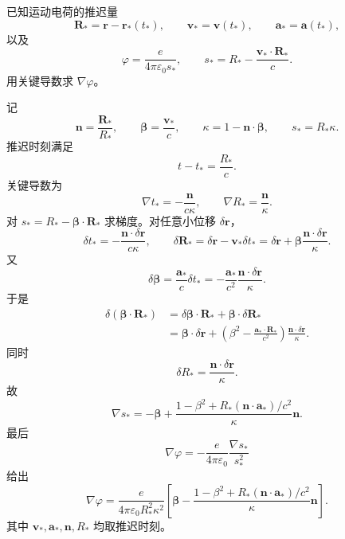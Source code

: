 \begin{question}
已知运动电荷的推迟量
\[
  \mathbf R_* = \mathbf r-\mathbf r_*(t_*),
  \qquad
  \mathbf v_* = \mathbf v(t_*),
  \qquad
  \mathbf a_* = \mathbf a(t_*),
\]
以及
\[
  \varphi=\frac{e}{4\pi\varepsilon_0s_*},
  \qquad
  s_*=R_* - \frac{\mathbf v_*\cdot\mathbf R_*}{c} .
\]
用关键导数求 $\nabla\varphi$。
\begin{solution}
记
\[
  \mathbf n=\frac{\mathbf R_*}{R_*},
  \qquad
  \boldsymbol\beta=\frac{\mathbf v_*}{c},
  \qquad
  \kappa=1-\mathbf n\cdot\boldsymbol\beta,
  \qquad
  s_*=R_*\kappa .
\]
推迟时刻满足
\[
  t-t_*=\frac{R_*}{c} .
\]
关键导数为
\[
  \nabla t_*=-\frac{\mathbf n}{c\kappa},
  \qquad
  \nabla R_* =\frac{\mathbf n}{\kappa} .
\]
对 $s_*=R_* - \boldsymbol\beta\cdot\mathbf R_*$ 求梯度。对任意小位移 $\delta\mathbf r$，
\[
  \delta t_*=-\frac{\mathbf n\cdot\delta\mathbf r}{c\kappa},
  \qquad
  \delta\mathbf R_*=
  \delta\mathbf r-\mathbf v_*\delta t_*
  =\delta\mathbf r+\boldsymbol\beta\frac{\mathbf n\cdot\delta\mathbf r}{\kappa} .
\]
又
\[
  \delta\boldsymbol\beta=\frac{\mathbf a_*}{c}\delta t_*
  =-\frac{\mathbf a_*}{c^2}\frac{\mathbf n\cdot\delta\mathbf r}{\kappa} .
\]
于是
\[
\begin{aligned}
  \delta(\boldsymbol\beta\cdot\mathbf R_*)
  &=\delta\boldsymbol\beta\cdot\mathbf R_*+\boldsymbol\beta\cdot\delta\mathbf R_* \\
  &=\boldsymbol\beta\cdot\delta\mathbf r
  +\left(\beta^2-\frac{\mathbf a_*\cdot\mathbf R_*}{c^2}\right)
    \frac{\mathbf n\cdot\delta\mathbf r}{\kappa} .
\end{aligned}
\]
同时
\[
  \delta R_* = \frac{\mathbf n\cdot\delta\mathbf r}{\kappa} .
\]
故
\[
  \nabla s_*=-\boldsymbol\beta+\frac{1-\beta^2+R_*(\mathbf n\cdot\mathbf a_*)/c^2}{\kappa}\mathbf n .
\]
最后
\[
  \nabla\varphi=-\frac{e}{4\pi\varepsilon_0}\frac{\nabla s_*}{s_*^2}
\]
给出
\[
  \boxed{
  \nabla\varphi
  =\frac{e}{4\pi\varepsilon_0R_*^2\kappa^2}
  \left[\boldsymbol\beta-\frac{1-\beta^2+R_*(\mathbf n\cdot\mathbf a_*)/c^2}{\kappa}\mathbf n\right]} .
\]
其中 $\mathbf v_*,\mathbf a_*,\mathbf n,R_*$ 均取推迟时刻。
\end{solution}
\end{question}

